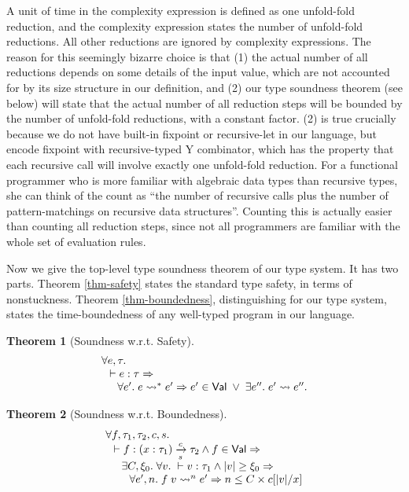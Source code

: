 \documentclass[preprint]{sigplanconf}
\newcommand{\arrow}[4]{#1\xrightarrow[#3]{#2}#4}
\newtheorem{thm}{Theorem}
\begin{document}
A unit of time in the complexity expression is defined as one unfold-fold reduction, and the complexity expression states the number of unfold-fold reductions. All other reductions are ignored by complexity expressions. The reason for this seemingly bizarre choice is that (1) the actual number of all reductions depends on some details of the input value, which are not accounted for by its size structure in our definition, and (2) our type soundness theorem (see below) will state that the actual number of all reduction steps will be bounded by the number of unfold-fold reductions, with a constant factor. (2) is true crucially because we do not have built-in fixpoint or recursive-let in our language, but encode fixpoint with recursive-typed Y combinator, which has the property that each recursive call will involve exactly one unfold-fold reduction. For a functional programmer who is more familiar with algebraic data types than recursive types, she can think of the count as ``the number of recursive calls plus the number of pattern-matchings on recursive data structures''. Counting this is actually easier than counting all reduction steps, since not all programmers are familiar with the whole set of evaluation rules.

Now we give the top-level type soundness theorem of our type system. It has two parts. Theorem \ref{thm-safety} states the standard type safety, in terms of nonstuckness. Theorem \ref{thm-boundedness}, distinguishing for our type system, states the time-boundedness of any well-typed program in our language.

\begin{thm}[\label{thm-safety}Soundness w.r.t. Safety]
$$
\begin{array}{l}
\forall e,\tau. \\
\hspace{.1in} \vdash e:\tau \Rightarrow \\
\hspace{.2in} \forall e'.\; e \leadsto^* e' \Rightarrow e'\in\mathsf{Val} \;\vee\; \exists e''.\;e' \leadsto e''.
\end{array}
$$
\end{thm}

\begin{thm}[\label{thm-boundedness}Soundness w.r.t. Boundedness]
$$
\begin{array}{l}
\forall f,\tau_1,\tau_2,c,s. \\
\hspace{0.1in} \vdash f:\arrow{(x:\tau_1)}{c}{s}{\tau_2} \wedge f\in\mathsf{Val}\Rightarrow \\
\hspace{0.2in} \exists C,\xi_0. \;\forall v.\; \vdash v:\tau_1 \wedge |v| \geq \xi_0 \Rightarrow \\
\hspace{0.3in} \forall e',n.\; f\;v\leadsto^n e' \Rightarrow n\leq C\times c[|v|/x]
\end{array}
$$
\end{thm}
\end{document}
